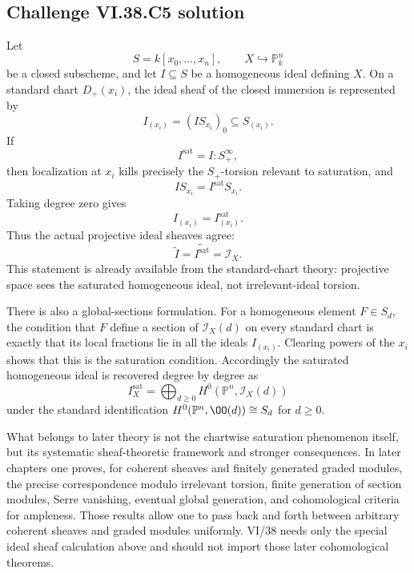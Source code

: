\subsection*{Challenge VI.38.C5 solution}
\begin{solution}
Let
\[
S=k[x_0,\ldots,x_n],
\qquad
X\hookrightarrow\mathbb P^n_k
\]
be a closed subscheme, and let \(I\subseteq S\) be a homogeneous ideal defining
\(X\).  On a standard chart \(D_+(x_i)\), the ideal sheaf of the closed immersion is
represented by
\[
I_{(x_i)}=(IS_{x_i})_0\subseteq S_{(x_i)}.
\]
If
\[
I^{\mathrm{sat}}=I:S_+^\infty,
\]
then localization at \(x_i\) kills precisely the \(S_+\)-torsion relevant to
saturation, and
\[
IS_{x_i}=I^{\mathrm{sat}}S_{x_i}.
\]
Taking degree zero gives
\[
I_{(x_i)}=I^{\mathrm{sat}}_{(x_i)}.
\]
Thus the actual projective ideal sheaves agree:
\[
\boxed{\widetilde I=\widetilde{I^{\mathrm{sat}}}=\mathcal I_X}.
\]
This statement is already available from the standard-chart theory: projective
space sees the saturated homogeneous ideal, not irrelevant-ideal torsion.

There is also a global-sections formulation. For a homogeneous element \(F\in S_d\),
the condition that \(F\) define a section of \(\mathcal I_X(d)\) on every standard
chart is exactly that its local fractions lie in all the ideals
\(I_{(x_i)}\). Clearing powers of the \(x_i\) shows that this is the saturation
condition. Accordingly the saturated homogeneous ideal is recovered degree by
degree as
\[
\boxed{
I_X^{\mathrm{sat}}
=
\bigoplus_{d\ge0}
H^0\!\left(\mathbb P^n,\mathcal I_X(d)\right)
}
\]
under the standard identification
\(H^0(\mathbb P^n,\OO(d))\cong S_d\) for \(d\ge0\).

What belongs to later theory is not the chartwise saturation phenomenon itself, but
its systematic sheaf-theoretic framework and stronger consequences.  In later
chapters one proves, for coherent sheaves and finitely generated graded modules,
the precise correspondence modulo irrelevant torsion, finite generation of section
modules, Serre vanishing, eventual global generation, and cohomological criteria
for ampleness.  Those results allow one to pass back and forth between arbitrary
coherent sheaves and graded modules uniformly.  VI/38 needs only the special ideal
sheaf calculation above and should not import those later cohomological theorems.
\end{solution}
